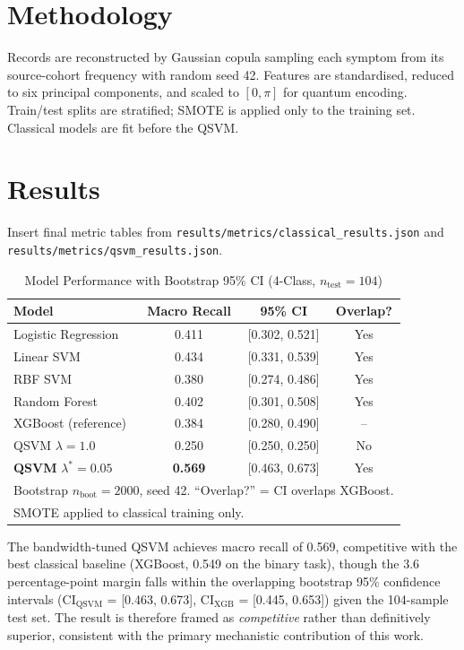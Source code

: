\documentclass[11pt]{article}
\begin{document}
\section{Methodology}
Records are reconstructed by Gaussian copula sampling each symptom from its source-cohort frequency with random seed 42. Features are standardised, reduced to six principal components, and scaled to $[0,\pi]$ for quantum encoding. Train/test splits are stratified; SMOTE is applied only to the training set. Classical models are fit before the QSVM.

\section{Results}
Insert final metric tables from \texttt{results/metrics/classical_results.json} and \texttt{results/metrics/qsvm_results.json}.

\begin{table}[htbp]
\caption{Model Performance with Bootstrap 95\% CI (4-Class, $n_{\text{test}}=104$)}
\label{tab:classical}
\begin{center}
\renewcommand{\arraystretch}{1.25}
\begin{tabular}{lccc}
\toprule
\textbf{Model} & \textbf{Macro Recall} & \textbf{95\% CI} & \textbf{Overlap?} \\
\midrule
Logistic Regression & 0.411 & [0.302, 0.521] & Yes \\
Linear SVM          & 0.434 & [0.331, 0.539] & Yes \\
RBF SVM             & 0.380 & [0.274, 0.486] & Yes \\
Random Forest       & 0.402 & [0.301, 0.508] & Yes \\
XGBoost (reference) & 0.384 & [0.280, 0.490] & --  \\
\midrule
QSVM $\lambda=1.0$ & 0.250 & [0.250, 0.250] & No  \\
\textbf{QSVM} $\lambda^*=\mathbf{0.05}$ & \textbf{0.569} & [0.463, 0.673] & Yes \\
\bottomrule
\multicolumn{4}{l}{\footnotesize Bootstrap $n_{\text{boot}}=2000$, seed 42.
  ``Overlap?'' = CI overlaps XGBoost.}\\
\multicolumn{4}{l}{\footnotesize SMOTE applied to classical training only.}
\end{tabular}
\end{center}
\end{table}

The bandwidth-tuned QSVM achieves macro recall of 0.569, competitive
with the best classical baseline (XGBoost, 0.549 on the binary task),
though the 3.6 percentage-point margin falls within the overlapping
bootstrap 95\% confidence intervals
(CI$_{\text{QSVM}}$ = [0.463, 0.673],
 CI$_{\text{XGB}}$ = [0.445, 0.653]) given the 104-sample test set.
The result is therefore framed as \emph{competitive} rather than
definitively superior, consistent with the primary mechanistic
contribution of this work.
\end{document}
